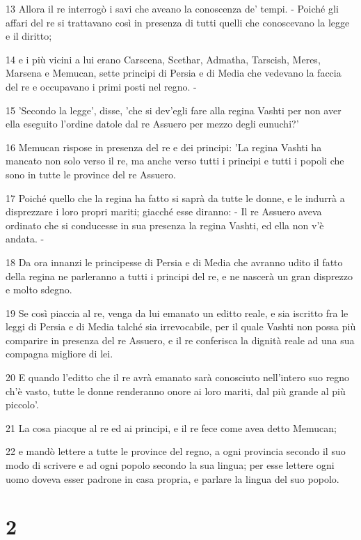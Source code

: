 \par 13 Allora il re interrogò i savi che aveano la conoscenza de' tempi. - Poiché gli affari del re si trattavano così in presenza di tutti quelli che conoscevano la legge e il diritto;
\par 14 e i più vicini a lui erano Carscena, Scethar, Admatha, Tarscish, Meres, Marsena e Memucan, sette principi di Persia e di Media che vedevano la faccia del re e occupavano i primi posti nel regno. -
\par 15 'Secondo la legge', disse, 'che si dev'egli fare alla regina Vashti per non aver ella eseguito l'ordine datole dal re Assuero per mezzo degli eunuchi?'
\par 16 Memucan rispose in presenza del re e dei principi: 'La regina Vashti ha mancato non solo verso il re, ma anche verso tutti i principi e tutti i popoli che sono in tutte le province del re Assuero.
\par 17 Poiché quello che la regina ha fatto si saprà da tutte le donne, e le indurrà a disprezzare i loro propri mariti; giacché esse diranno: - Il re Assuero aveva ordinato che si conducesse in sua presenza la regina Vashti, ed ella non v'è andata. -
\par 18 Da ora innanzi le principesse di Persia e di Media che avranno udito il fatto della regina ne parleranno a tutti i principi del re, e ne nascerà un gran disprezzo e molto sdegno.
\par 19 Se così piaccia al re, venga da lui emanato un editto reale, e sia iscritto fra le leggi di Persia e di Media talché sia irrevocabile, per il quale Vashti non possa più comparire in presenza del re Assuero, e il re conferisca la dignità reale ad una sua compagna migliore di lei.
\par 20 E quando l'editto che il re avrà emanato sarà conosciuto nell'intero suo regno ch'è vasto, tutte le donne renderanno onore ai loro mariti, dal più grande al più piccolo'.
\par 21 La cosa piacque al re ed ai principi, e il re fece come avea detto Memucan;
\par 22 e mandò lettere a tutte le province del regno, a ogni provincia secondo il suo modo di scrivere e ad ogni popolo secondo la sua lingua; per esse lettere ogni uomo doveva esser padrone in casa propria, e parlare la lingua del suo popolo.

\chapter{2}

